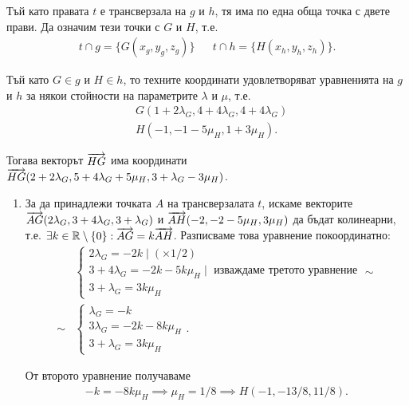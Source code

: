 \documentclass[numbers=endperiod, bibliography=totocnumbered]{scrartcl}
\begin{document}
\begin{solution}
  Тъй като правата \( t \) е трансверзала на \( g \) и \( h \), тя има по една обща точка с двете прави. Да означим тези точки с \( G \) и \( H \), т.е.
  \begin{align*}
    t \cap g = \{ G(x_g, y_g, z_g) \}
    &&
    t \cap h = \{ H(x_h, y_h, z_h) \}.
  \end{align*}

  Тъй като \( G \in g \) и \( H \in h \), то техните координати удовлетворяват уравненията на \( g \) и \( h \) за някои стойности на параметрите \( \lambda \) и \( \mu \), т.е.
  \begin{align*}
    &G(1 + 2\lambda_G, 4 + 4\lambda_G, 4 + 4\lambda_G) \\
    &H(-1, -1 -5\mu_H, 1 + 3\mu_H).
  \end{align*}

  Тогава векторът \( \overrightarrow{HG} \) има координати \( \overrightarrow{HG}(2 + 2\lambda_G, 5 + 4\lambda_G + 5\mu_H, 3 + \lambda_G - 3\mu_H) \).

  \begin{enumerate}[label=\alph*)]
    \item За да принадлежи точката \( A \) на трансверзалата \( t \), искаме векторите \( \overrightarrow{AG}(2\lambda_G, 3 + 4\lambda_G, 3 + \lambda_G) \) и \( \overrightarrow{AH}(-2, -2 - 5\mu_H, 3\mu_H) \) да бъдат колинеарни, т.е. \( \exists k \in \mathbb{R} \setminus \{ 0 \}: \overrightarrow{AG} = k\overrightarrow{AH} \). Разписваме това уравнение покоординатно:
    \begin{align*}
      &\begin{cases}
        2\lambda_G = -2k \mid (\times 1 / 2) \\
        3 + 4\lambda_G = -2k - 5k\mu_H \mid \text{ изваждаме третото уравнение} \\
        3 + \lambda_G = 3k\mu_H
      \end{cases}
      \sim \\ \sim
      &\begin{cases}
        \lambda_G = -k \\
        3\lambda_G = -2k - 8k\mu_H \\
        3 + \lambda_G = 3k\mu_H
      \end{cases}.
    \end{align*}

    От второто уравнение получаваме
    \begin{align*}
      -k = -8k\mu_H \implies \mu_H = 1 / 8 \implies H(-1, -13/8, 11/8).
    \end{align*}


\end{enumerate}
\end{solution}
\end{document}
